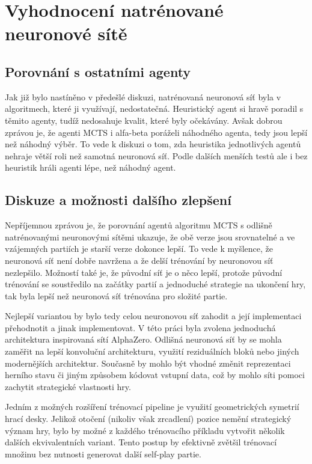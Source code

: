 \section{Vyhodnocení natrénované neuronové sítě}

\subsection{Porovnání s ostatními agenty}

Jak již bylo nastíněno v předešlé diskuzi, natrénovaná neuronová síť byla v algoritmech, které ji využívají, nedostatečná.
Heuristický agent si hravě poradil s těmito agenty, tudíž nedosahuje kvalit, které byly očekávány. Avšak dobrou zprávou je, že 
agenti MCTS i alfa-beta poráželi náhodného agenta, tedy jsou lepší než náhodný výběr. To vede k diskuzi o tom, zda heuristika jednotlivých
agentů nehraje větší roli než samotná neuronová síť. Podle dalších menších testů ale i bez heuristik hráli agenti lépe, než náhodný agent.

\subsection{Diskuze a možnosti dalšího zlepšení}

Nepříjemnou zprávou je, že porovnání agentů algoritmu MCTS s odlišně natrénovanými neuronovými sítěmi ukazuje, že obě verze jsou srovnatelné 
a ve vzájemných partiích je starší verze dokonce lepší. To vede k myšlence, že neuronová síť není dobře navržena a že delší trénování 
by neuronovou síť nezlepšilo. Možností také je, že původní síť je o něco lepší, protože původní trénování se soustředilo na začátky partií
a jednoduché strategie na ukončení hry, tak byla lepší než neuronová síť trénována pro složité partie.

Nejlepší variantou by bylo tedy celou neuronovou síť zahodit a její implementaci přehodnotit a jinak implementovat. V této práci byla zvolena jednoduchá
architektura inspirovaná sítí AlphaZero. Odlišná neuronová síť by se mohla zaměřit na lepší konvoluční architekturu, využití reziduálních bloků
nebo jiných modernějších architektur. Současně by mohlo být vhodné změnit reprezentaci herního stavu či jiným způsobem kódovat vstupní data,
což by mohlo síti pomoci zachytit strategické vlastnosti hry.

Jedním z možných rozšíření trénovací pipeline je využití geometrických symetrií hrací desky. Jelikož otočení (nikoliv však zrcadlení) pozice nemění strategický 
význam hry, bylo by možné z každého trénovacího příkladu vytvořit několik dalších ekvivalentních variant. Tento postup by efektivně zvětšil trénovací množinu 
bez nutnosti generovat další self-play partie.

